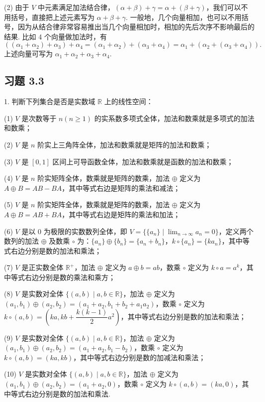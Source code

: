 \documentclass[UTF8, 12pt, fontset=fandol, oneside]{ctexart}
\begin{document}
(2) 由于 $V$ 中元素满足加法结合律，$(\alpha+\beta)+\gamma=\alpha+(\beta+\gamma)$，我们可以不用括号，直接把上述元素写为 $\alpha+\beta+\gamma$. 一般地，几个向量相加，也可以不用括号，因为从结合律非常容易推出当几个向量相加时，相加的先后次序不影响最后的结果. 比如 4 个向量做加法时，有
\[
((\alpha_1+\alpha_2)+\alpha_3)+\alpha_4=(\alpha_1+\alpha_2)+(\alpha_3+\alpha_4)=\alpha_1+(\alpha_2+(\alpha_3+\alpha_4)).
\]
上述向量可写为 $\alpha_1+\alpha_2+\alpha_3+\alpha_4$.

\subsection*{习题 3.3}

1. 判断下列集合是否是实数域 $\mathbb{R}$ 上的线性空间：

(1) $V$ 是次数等于 $n(n\geq 1)$ 的实系数多项式全体，加法和数乘就是多项式的加法和数乘；

(2) $V$ 是 $n$ 阶实上三角阵全体，加法和数乘就是矩阵的加法和数乘；

(3) $V$ 是 $[0,1]$ 区间上可导函数全体，加法和数乘就是函数的加法和数乘；

(4) $V$ 是 $n$ 阶实矩阵全体，数乘就是矩阵的数乘，加法 $\oplus$ 定义为 $A\oplus B=AB-BA$，其中等式右边是矩阵的乘法和减法；

(5) $V$ 是 $n$ 阶实矩阵全体，数乘就是矩阵的数乘，加法 $\oplus$ 定义为 $A\oplus B=AB+BA$，其中等式右边是矩阵的乘法和加法；

(6) $V$ 是以 $0$ 为极限的实数数列全体，即 $V=\{\{a_n\}\mid \lim_{n\to\infty}a_n=0\}$，定义两个数列的加法 $\oplus$ 及数乘 $\circ$ 为：$\{a_n\}\oplus\{b_n\}=\{a_n+b_n\}$，$k\circ\{a_n\}=\{ka_n\}$，其中等式右边分别是数的加法和乘法；

(7) $V$ 是正实数全体 $\mathbb{R}^+$，加法 $\oplus$ 定义为 $a\oplus b=ab$，数乘 $\circ$ 定义为 $k\circ a=a^k$，其中等式右边分别是数的乘法和乘方；

(8) $V$ 是实数对全体 $\{(a,b)\mid a,b\in\mathbb{R}\}$，加法 $\oplus$ 定义为 $(a_1,b_1)\oplus(a_2,b_2)=(a_1+a_2,b_1+b_2+a_1a_2)$，数乘 $\circ$ 定义为 $k\circ(a,b)=(ka,kb+\dfrac{k(k-1)}{2}a^2)$，其中等式右边分别是数的加法和乘法；

(9) $V$ 是实数对全体 $\{(a,b)\mid a,b\in\mathbb{R}\}$，加法 $\oplus$ 定义为 $(a_1,b_1)\oplus(a_2,b_2)=(a_1+a_2,b_1-b_2)$，数乘 $\circ$ 定义为 $k\circ(a,b)=(ka,kb)$，其中等式右边分别是数的加减法和乘法；

(10) $V$ 是实数对全体 $\{(a,b)\mid a,b\in\mathbb{R}\}$，加法 $\oplus$ 定义为 $(a_1,b_1)\oplus(a_2,b_2)=(a_1+a_2,0)$，数乘 $\circ$ 定义为 $k\circ(a,b)=(ka,0)$，其中等式右边分别是数的加法和乘法.
\end{document}
